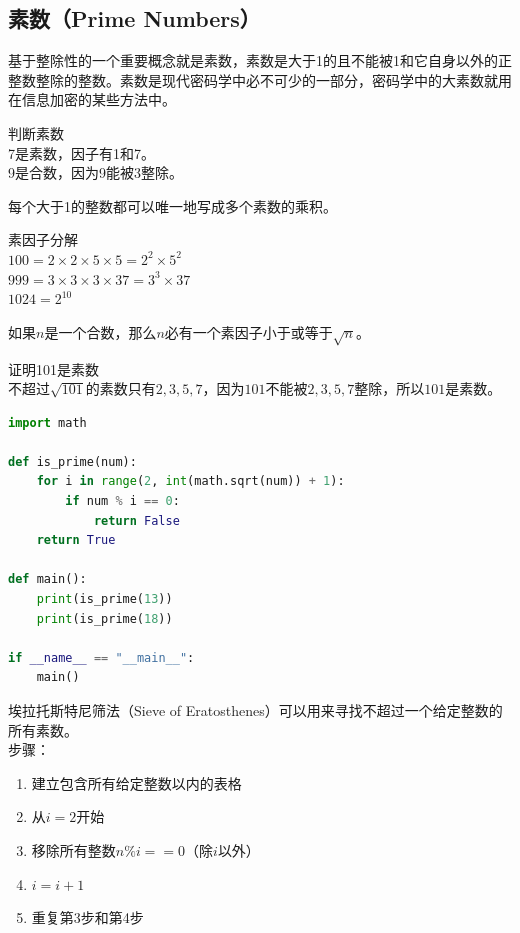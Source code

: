\documentclass[12pt, openany, oneside]{book}
\begin{document}
\subsection{素数（Prime Numbers）}

基于整除性的一个重要概念就是素数，素数是大于1的且不能被1和它自身以外的正整数整除的整数。素数是现代密码学中必不可少的一部分，密码学中的大素数就用在信息加密的某些方法中。

\begin{tcolorbox}
	判断素数\\
	7是素数，因子有1和7。\\
	9是合数，因为9能被3整除。
\end{tcolorbox}

每个大于1的整数都可以唯一地写成多个素数的乘积。

\begin{tcolorbox}
	素因子分解\\
	$ 100 = 2 \times 2 \times 5 \times 5 = 2^2 \times 5^2 $\\
	$ 999 = 3 \times 3 \times 3 \times 37 = 3^3 \times 37 $\\
	$ 1024 = 2^{10} $
\end{tcolorbox}

如果$ n $是一个合数，那么$ n $必有一个素因子小于或等于$ \sqrt{n} $。

\begin{tcolorbox}
	证明101是素数\\
	不超过$ \sqrt{101} $的素数只有$ 2, 3, 5, 7 $，因为$ 101 $不能被$ 2, 3, 5, 7 $整除，所以$ 101 $是素数。
\end{tcolorbox}

\vspace{-0.5cm}
\begin{lstlisting}[language=Python]
import math

def is_prime(num):
	for i in range(2, int(math.sqrt(num)) + 1):
		if num % i == 0:
			return False
	return True

def main():
	print(is_prime(13))
	print(is_prime(18))

if __name__ == "__main__":
	main()
\end{lstlisting}

埃拉托斯特尼筛法（Sieve of Eratosthenes）可以用来寻找不超过一个给定整数的所有素数。\\

步骤：

\begin{enumerate}
	\item 建立包含所有给定整数以内的表格
	\item 从$ i = 2 $开始
	\item 移除所有整数$ n \% i == 0 $（除$ i $以外）
	\item $ i = i + 1 $
	\item 重复第3步和第4步
\end{enumerate}
\end{document}
